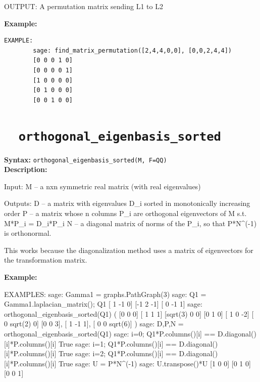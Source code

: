 \documentclass{article}
\begin{document}
\noindent
OUTPUT: A permutation matrix sending L1 to L2

\textbf{Example:}
\begin{verbatim}
EXAMPLE:
        sage: find_matrix_permutation([2,4,4,0,0], [0,0,2,4,4])
        [0 0 0 1 0]
        [0 0 0 0 1]
        [1 0 0 0 0]
        [0 1 0 0 0]
        [0 0 1 0 0]

\end{verbatim}
     
\section{\tt \ \ orthogonal\_eigenbasis\_sorted}

\textbf{Syntax:} \verb}orthogonal_eigenbasis_sorted(M, F=QQ)}\\

\textbf{Description:}
\begin{spverbatim}
Input:
      M -- a nxn symmetric real matrix (with real eigenvalues)

Outputs:
      D -- a matrix with eigenvalues D_i sorted in monotonically
           increasing order
      P -- a matrix whose n columns P_i are orthogonal eigenvectors of M s.t.
	   M*P_i = D_i*P_i
      N -- a diagonal matrix of norms of the P_i, so
           that P*N^(-1) is orthonormal.

This works because the diagonalization method uses a matrix of eigenvectors for the
transformation matrix.
\end{spverbatim}

\textbf{Example:}
\begin{spverbatim}
EXAMPLES:
        sage: Gamma1 = graphs.PathGraph(3)
        sage: Q1 = Gamma1.laplacian_matrix(); Q1
        [ 1 -1  0]
        [-1  2 -1]
        [ 0 -1  1]
        sage:  orthogonal_eigenbasis_sorted(Q1)
        (
        [0 0 0]  [ 1  1  1]  [sqrt(3)       0       0]
        [0 1 0]  [ 1  0 -2]  [      0 sqrt(2)       0]
        [0 0 3], [ 1 -1  1], [      0       0 sqrt(6)]
        )
        sage: D,P,N = orthogonal_eigenbasis_sorted(Q1)
        sage: i=0; Q1*P.columns()[i] == D.diagonal()[i]*P.columns()[i]
        True
        sage: i=1; Q1*P.columns()[i] == D.diagonal()[i]*P.columns()[i]
        True
        sage: i=2; Q1*P.columns()[i] == D.diagonal()[i]*P.columns()[i]
        True
        sage: U = P*N^(-1)
        sage: U.transpose()*U
        [1 0 0]
        [0 1 0]
        [0 0 1]
\end{spverbatim}
\end{document}
